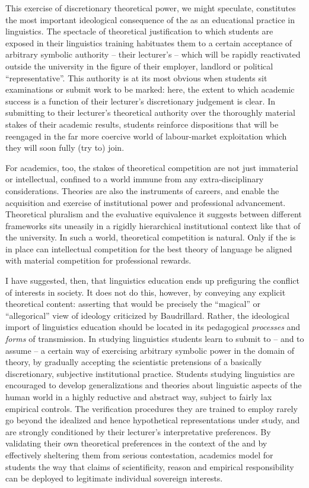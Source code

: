 \documentclass[output=paper]{langscibook}
\begin{document}
This exercise of discretionary theoretical power, we might speculate, constitutes the most important ideological consequence of the  as an educational practice in linguistics. The spectacle of theoretical justification to which students are exposed in their linguistics training habituates them to a certain acceptance of arbitrary symbolic authority -- their lecturer's -- which will be rapidly reactivated outside the university in the figure of their employer, landlord or political ``representative''. This authority is at its most obvious when students sit examinations or submit work to be marked: here, the extent to which academic success is a function of their lecturer's discretionary judgement is clear. In submitting to their lecturer's theoretical authority over the thoroughly material stakes of their academic results, students reinforce dispositions that will be reengaged in the far more coercive world of labour-market exploitation which they will soon fully (try to) join.

For academics, too, the stakes of theoretical competition are not just immaterial or intellectual, confined to a world immune from any extra-disciplinary considerations. Theories are also the instruments of careers, and enable the acquisition and exercise of institutional power and professional advancement. Theoretical pluralism and the evaluative equivalence it suggests between different frameworks sits uneasily in a rigidly hierarchical institutional context like that of the university. In such a world, theoretical competition is natural. Only if the  is in place can intellectual competition for the best theory of language be aligned with material competition for professional rewards.

I have suggested, then, that linguistics education ends up prefiguring the conflict of interests in society. It does not do this, however, by conveying any explicit theoretical content: asserting that would be precisely the ``magical'' or ``allegorical'' view of ideology criticized by Baudrillard. Rather, the ideological import of linguistics education should be located in its pedagogical \emph{processes} and \emph{forms} of transmission. In studying linguistics students learn to submit to -- and to assume -- a certain way of exercising arbitrary symbolic power in the domain of theory, by gradually accepting the scientistic pretensions of a basically discretionary, subjective institutional practice. Students studying linguistics are encouraged to develop generalizations and theories about linguistic aspects of the human world in a highly reductive and abstract way, subject to fairly lax empirical controls. The verification procedures they are trained to employ rarely go beyond the idealized and hence hypothetical representations under study, and are strongly conditioned by their lecturer's interpretative preferences. By validating their own theoretical preferences in the context of the  and by effectively sheltering them from serious contestation, academics model for students the way that claims of scientificity, reason and empirical responsibility can be deployed to legitimate individual sovereign interests.
\end{document}
